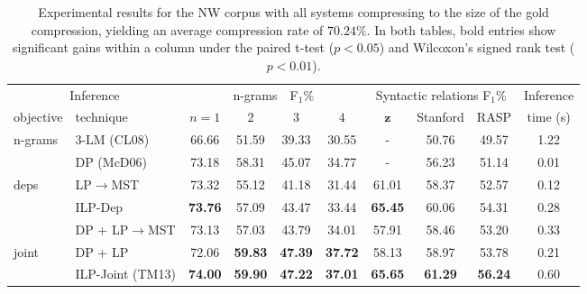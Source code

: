 \documentclass[11pt,a4paper]{article}
\begin{document}
\begin{table*}[t]
    \setlength{\tabcolsep}{4pt}
    \setlength{\belowcaptionskip}{-5pt}
\centering
\begin{tabular}{|p{40pt}l|cccc|ccc|c|}
        \hline
        \multicolumn{2}{|c|}{Inference}  & \multicolumn{4}{c|}{n-grams\ \ F$_1\%$} & \multicolumn{3}{c|}{Syntactic relations F$_1$\%} & Inference \\
        objective & \quad technique & $n=1$ & $2$ & $3$ & $4$ & $\mathbf{z}$ & Stanford & RASP & time (s) \\
        \hline
        \hline
        \multirow{2}{*}{n-grams} & 3-LM (CL08) & 66.66 & 51.59 & 39.33 & 30.55 & - & 50.76 & 49.57 & 1.22 \\
        & DP (McD06) & 73.18 & 58.31 & 45.07 & 34.77 & - & 56.23 & 51.14 & 0.01  \\
        \hline
        \multirow{2}{*}{deps} & LP$\rightarrow$MST   & 73.32 & 55.12 & 41.18 & 31.44 & 61.01 & 58.37 & 52.57 & 0.12 \\
        & ILP-Dep   & {\bf 73.76} & 57.09 & 43.47 & 33.44 & {\bf 65.45} & 60.06 & 54.31 & 0.28  \\
        \hline
        & DP + LP$\rightarrow$MST   & 73.13 & 57.03 & 43.79 & 34.01 & 57.91 & 58.46 & 53.20 & 0.33 \\
        joint & DP + LP & 72.06 & {\bf 59.83} & {\bf 47.39} & {\bf 37.72} & 58.13 & 58.97 & 53.78 & 0.21 \\
        & ILP-Joint (TM13)  & {\bf 74.00} & {\bf 59.90} & {\bf 47.22} & {\bf 37.01} & {\bf 65.65} & {\bf 61.29} & {\bf 56.24} & 0.60  \\
        \hline
\end{tabular}
\caption{Experimental results for the NW corpus with
    all systems compressing to the size of the
    gold compression, yielding an average compression rate of $70.24\%$.
    In both tables, bold entries show significant gains within a column
    under the paired t-test ($p < 0.05$) and Wilcoxon's signed rank test ($p < 0.01$).}
\label{tab:nw}
\end{table*}
\end{document}
